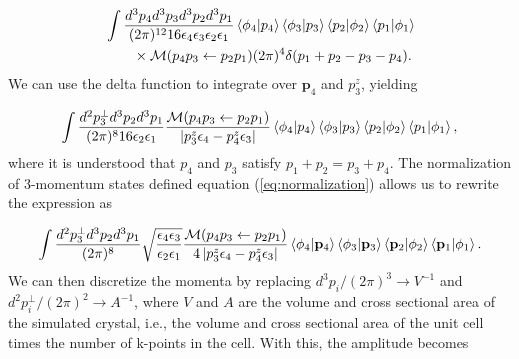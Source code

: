 \documentclass{article}
\begin{document}
\begin{equation}
\label{eq:ampPlugInM}
\begin{aligned}
    &\int\frac{d^3p_4d^3p_3d^3p_2d^3p_1}
    {(2\pi)^{12} 16\epsilon_4\epsilon_3\epsilon_2\epsilon_1}
    \bra{\phi_4}\ket{p_4}
    \bra{\phi_3}\ket{p_3}
    \bra{p_2}\ket{\phi_2}
    \bra{p_1}\ket{\phi_1}
    \\&\qquad\times
    \mathcal{M}(p_4p_3\leftarrow p_2p_1)
    (2\pi)^4\delta(p_1 + p_2 - p_3 - p_4).
\end{aligned}
\end{equation}
%
We can use the delta function to integrate over $\mathbf{p}_4$ and $p_3^z$, yielding

\begin{equation}
\label{eq:ampUseDelta}
\begin{aligned}
    \int\frac{d^2p_3^\perp d^3p_2d^3p_1}
    {(2\pi)^{8} 16\epsilon_2\epsilon_1}
    \frac{\mathcal{M}(p_4p_3\leftarrow p_2p_1)}
    {\left|p_3^z\epsilon_4 - p_4^z\epsilon_3\right|}
    \bra{\phi_4}\ket{p_4}
    \bra{\phi_3}\ket{p_3}
    \bra{p_2}\ket{\phi_2}
    \bra{p_1}\ket{\phi_1},
\end{aligned}
\end{equation}
%
where it is understood that $p_4$ and $p_3$ satisfy $p_1 + p_2 = p_3 + p_4$.
The normalization of 3-momentum states defined equation (\ref{eq:normalization}) allows us to rewrite the expression as

\begin{equation}
\label{eq:amp3Mom}
\begin{aligned}
    \int\frac{d^2p_3^\perp d^3p_2d^3p_1}{(2\pi)^{8}}
    \sqrt{\frac{\epsilon_4\epsilon_3}{\epsilon_2\epsilon_1}}
    \frac{\mathcal{M}(p_4p_3\leftarrow p_2p_1)}
    {4\left|p_3^z\epsilon_4 - p_4^z\epsilon_3\right|}
    \bra{\phi_4}\ket{\mathbf{p}_4}
    \bra{\phi_3}\ket{\mathbf{p}_3}
    \bra{\mathbf{p}_2}\ket{\phi_2}
    \bra{\mathbf{p}_1}\ket{\phi_1}.
\end{aligned}
\end{equation}
%
We can then discretize the momenta by replacing $d^3p_i/(2\pi)^3 \rightarrow V^{-1}$ and $d^2p_i^\perp/(2\pi)^2 \rightarrow A^{-1}$, where $V$ and $A$ are the volume and cross sectional area of the simulated crystal, i.e., the volume and cross sectional area of the unit cell times the number of k-points in the cell.  With this, the amplitude becomes
\end{document}
